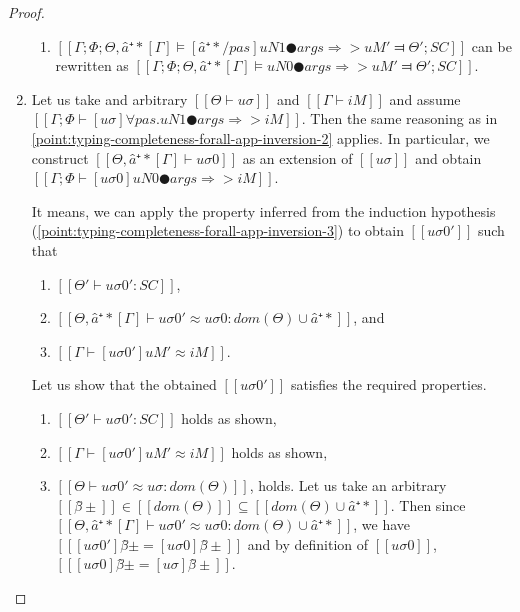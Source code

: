 \begin{proof}
\begin{caseof}
\begin{enumerate}
\begin{enumerate}
                        \item $[[Γ; Φ; Θ, â⁺*[Γ] ⊨ [â⁺*/pas]uN1 ● args ⇒> uM' ⫤ Θ'; SC]]$
                            can be rewritten as 
                            $[[ Γ; Φ; Θ, â⁺*[Γ] ⊨ uN0 ● args ⇒> uM' ⫤ Θ'; SC ]]$.
                    \end{enumerate}
                \item Let us take and arbitrary $[[Θ ⊢ uσ]]$ and $[[Γ ⊢ iM]]$
                    and assume $[[Γ; Φ ⊢ [uσ]∀pas.uN1  ● args ⇒> iM]]$. 
                    Then the same reasoning as in 
                    \ref{point:typing-completeness-forall-app-inversion-2}
                    applies. In particular, we construct 
                    $[[Θ, â⁺*[Γ] ⊢ uσ0]]$ as an extension of $[[uσ]]$
                    and obtain 
                    $[[Γ; Φ ⊢ [uσ0]uN0 ● args ⇒> iM]]$.

                    It means, we can apply the property inferred from the induction hypothesis 
                    (\ref{point:typing-completeness-forall-app-inversion-3})
                    to obtain $[[uσ0']]$ such that 
                    \begin{enumerate}
                        \item $[[Θ' ⊢ uσ0' : SC]]$,
                        \item $[[Θ, â⁺*[Γ] ⊢ uσ0' ≈ uσ0 : dom(Θ) ∪ {â⁺*}]]$, and 
                        \item $[[Γ ⊢ [uσ0']uM' ≈ iM]]$.
                    \end{enumerate}

                    Let us show that the obtained $[[uσ0']]$ satisfies the required properties.
                    \begin{enumerate}
                        \item $[[Θ' ⊢ uσ0' : SC]]$ holds as shown,
                        \item $[[Γ ⊢ [uσ0']uM' ≈ iM]]$ holds as shown,
                        \item $[[Θ ⊢ uσ0' ≈ uσ : dom(Θ)]]$,
                            holds. Let us take an arbitrary 
                            $[[β̂±]] \in [[dom(Θ)]] \subseteq [[dom(Θ) ∪ {â⁺*}]]$. Then 
                            since $[[Θ, â⁺*[Γ] ⊢ uσ0' ≈ uσ0 : dom(Θ) ∪ {â⁺*}]]$, 
                            we have $[[ [uσ0']β̂±  = [uσ0]β̂± ]]$ and 
                            by definition of $[[uσ0]]$, $[[ [uσ0]β̂±  = [uσ]β̂± ]]$.
                    \end{enumerate}
            \end{enumerate}
            

\end{caseof}
\end{proof}
